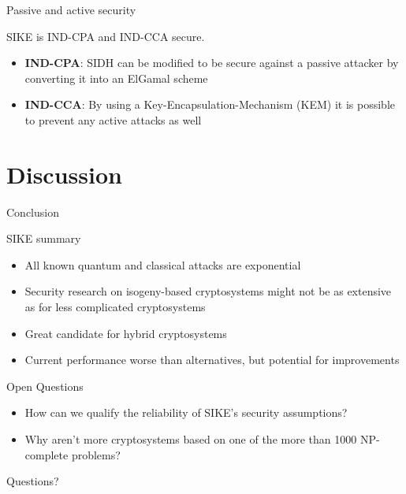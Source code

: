 \documentclass[handout]{beamer}
\begin{document}
\begin{frame}{Passive and active security}

SIKE is IND-CPA and IND-CCA secure.

\begin{itemize}[\textbullet]
	\item \textbf{IND-CPA}: SIDH can be modified to be secure against a passive attacker by converting it into an ElGamal scheme
	\item \textbf{IND-CCA}: By using a Key-Encapsulation-Mechanism (KEM) it is possible to prevent any active attacks as well
\end{itemize}

\end{frame}

\section{Discussion}

\begin{frame}{Conclusion}

SIKE summary
\begin{itemize}[\textbullet]
	
	\item All known quantum and classical attacks are exponential\pause
	\item Security research on isogeny-based cryptosystems might not be as extensive as for less complicated cryptosystems\pause
	\item Great candidate for hybrid cryptosystems\pause
	\item Current performance worse than alternatives, but potential for improvements\pause
\end{itemize}
\vfill
Open Questions
\begin{itemize}[\textbullet]
	\item How can we qualify the reliability of SIKE's security assumptions?\pause
	\item Why aren't more cryptosystems based on one of the more than 1000 NP-complete problems? 
\end{itemize}
\end{frame}

\begin{frame}{Questions?}

\end{frame}
\end{document}
